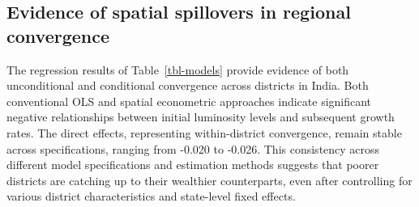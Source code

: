 \documentclass[
  a4paper, 
  twoside,
  review
]{article}
\begin{document}
\subsection{Evidence of spatial spillovers in regional
convergence}\label{evidence-of-spatial-spillovers-in-regional-convergence}

The regression results of Table~\ref{tbl-models} provide evidence of
both unconditional and conditional convergence across districts in
India. Both conventional OLS and spatial econometric approaches indicate
significant negative relationships between initial luminosity levels and
subsequent growth rates. The direct effects, representing
within-district convergence, remain stable across specifications,
ranging from -0.020 to -0.026. This consistency across different model
specifications and estimation methods suggests that poorer districts are
catching up to their wealthier counterparts, even after controlling for
various district characteristics and state-level fixed effects.
\end{document}
